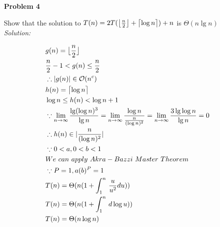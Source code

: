 \documentclass[12pt,letterpaper]{article}
\DeclarePairedDelimiter{\ceil}{\lceil}{\rceil}
\DeclarePairedDelimiter\floor{\lfloor}{\rfloor}
\def\pp{\par\noindent}
\newcommand{\problem}[1]{ \bigskip \pp \textbf{Problem #1}\par}
\newcommand{\solution}{\textit{Solution:}\par}
\begin{document}
\problem{4}
Show that the solution to $T(n) = 2T(\floor[\big]{\frac{n}{2}}+ \ceil[\big]{\log n}) + n$ is $\Theta(n \lg n)$ \\
\solution
\begin{align*}
& g(n) = \floor[\big]{\frac{n}{2}} \\
& \frac{n}{2} - 1 < g(n) \le \frac{n}{2} \\ 
& \therefore |g(n)| \in \mathcal{O}(n^c) \\
& h(n) = \ceil[\big]{\log n} \\
& \log n \le h(n) < \log n +1 \\
& \because \lim_{n \to \infty} \frac{\lg (\log n)^3 }{\lg n} = \lim_{n \to \infty} \frac{\log n}{\frac{n}{(\log n)^2}} = \lim_{n \to \infty} \frac{3 \lg \log n}{\lg n } = 0 \\
& \therefore h(n) \in |\frac{n}{(\log n)^2}| \\
& \because 0 < a, 0 < b < 1 \\
& We\ can\ apply\ Akra-Bazzi\ Master\ Theorem \\
& \because P=1, a(b)^P = 1 \\
& T(n) = \Theta(n(1+\int^n_1 \, \frac{u}{u^2} du )) \\
& T(n) = \Theta(n(1+\int^n_1 \, d \log u )) \\
& T(n) = \Theta(n \log n) 
\end{align*}
\end{document}
